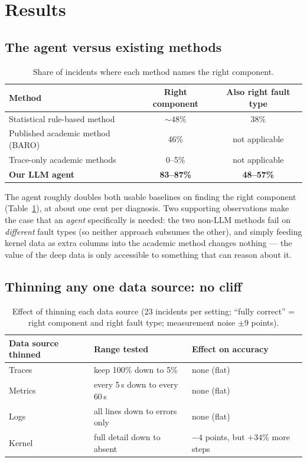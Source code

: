 \section{Results}
\label{sec:results}

\subsection{The agent versus existing methods}

\begin{table}[h]
\centering
\caption{Share of incidents where each method names the right component.}
\label{tab:baselines}
\begin{tabular}{lcc}
\toprule
Method & Right component & Also right fault type \\
\midrule
Statistical rule-based method & ${\sim}48\%$ & 38\% \\
Published academic method (BARO) & 46\% & not applicable \\
Trace-only academic methods & 0--5\% & not applicable \\
\textbf{Our LLM agent} & \textbf{83--87\%} & \textbf{48--57\%} \\
\bottomrule
\end{tabular}
\end{table}

The agent roughly doubles both usable baselines on finding the right component
(Table~\ref{tab:baselines}), at about one cent per diagnosis. Two supporting
observations make the case that an \emph{agent} specifically is needed: the two
non-LLM methods fail on \emph{different} fault types (so neither approach subsumes
the other), and simply feeding kernel data as extra columns into the academic method
changes nothing --- the value of the deep data is only accessible to something that
can reason about it.

\subsection{Thinning any one data source: no cliff}

\begin{table}[h]
\centering
\caption{Effect of thinning each data source (23 incidents per setting; ``fully
correct'' = right component and right fault type; measurement noise $\pm 9$ points).}
\label{tab:degradation}
\begin{tabular}{lll}
\toprule
Data source thinned & Range tested & Effect on accuracy \\
\midrule
Traces & keep 100\% down to 5\% & none (flat) \\
Metrics & every 5\,s down to every 60\,s & none (flat) \\
Logs & all lines down to errors only & none (flat) \\
Kernel & full detail down to absent & $-4$ points, but $+34\%$ more steps \\
\bottomrule
\end{tabular}
\end{table}

